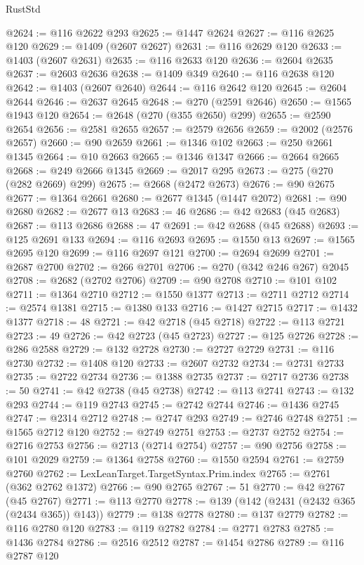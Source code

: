 \begin{lexlean}{RustStd}
\begin{coremodule}
@2624 := @116 @2622 @293
@2625 := @1447 @2624
@2627 := @116 @2625 @120
@2629 := @1409 (@2607 @2627)
@2631 := @116 @2629 @120
@2633 := @1403 (@2607 @2631)
@2635 := @116 @2633 @120
@2636 := @2604 @2635
@2637 := @2603 @2636
@2638 := @1409 @349
@2640 := @116 @2638 @120
@2642 := @1403 (@2607 @2640)
@2644 := @116 @2642 @120
@2645 := @2604 @2644
@2646 := @2637 @2645
@2648 := @270 (@2591 @2646)
@2650 := @1565 @1943 @120
@2654 := @2648 (@270 (@355 @2650) @299)
@2655 := @2590 @2654
@2656 := @2581 @2655
@2657 := @2579 @2656
@2659 := @2002 (@2576 @2657)
@2660 := @90 @2659
@2661 := @1346 @102
@2663 := @250 @2661 @1345
@2664 := @10 @2663
@2665 := @1346 @1347
@2666 := @2664 @2665
@2668 := @249 @2666 @1345
@2669 := @2017 @295
@2673 := @275 (@270 (@282 @2669) @299)
@2675 := @2668 (@2472 @2673)
@2676 := @90 @2675
@2677 := @1364 @2661
@2680 := @2677 @1345 (@1447 @2072)
@2681 := @90 @2680
@2682 := @2677 @13
@2683 := 46
@2686 := @42 @2683 (@45 @2683)
@2687 := @113 @2686
@2688 := 47
@2691 := @42 @2688 (@45 @2688)
@2693 := @125 @2691 @133
@2694 := @116 @2693
@2695 := @1550 @13
@2697 := @1565 @2695 @120
@2699 := @116 @2697 @121
@2700 := @2694 @2699
@2701 := @2687 @2700
@2702 := @266 @2701
@2706 := @270 (@342 @246 @267) @2045
@2708 := @2682 (@2702 @2706)
@2709 := @90 @2708
@2710 := @101 @102
@2711 := @1364 @2710
@2712 := @1550 @1377
@2713 := @2711 @2712
@2714 := @2574 @1381
@2715 := @1380 @133
@2716 := @1427 @2715
@2717 := @1432 @1377
@2718 := 48
@2721 := @42 @2718 (@45 @2718)
@2722 := @113 @2721
@2723 := 49
@2726 := @42 @2723 (@45 @2723)
@2727 := @125 @2726
@2728 := @286 @2588
@2729 := @132 @2728
@2730 := @2727 @2729
@2731 := @116 @2730
@2732 := @1408 @120
@2733 := @2607 @2732
@2734 := @2731 @2733
@2735 := @2722 @2734
@2736 := @1388 @2735
@2737 := @2717 @2736
@2738 := 50
@2741 := @42 @2738 (@45 @2738)
@2742 := @113 @2741
@2743 := @132 @293
@2744 := @119 @2743
@2745 := @2742 @2744
@2746 := @1436 @2745
@2747 := @2314 @2712
@2748 := @2747 @293
@2749 := @2746 @2748
@2751 := @1565 @2712 @120
@2752 := @2749 @2751
@2753 := @2737 @2752
@2754 := @2716 @2753
@2756 := @2713 (@2714 @2754)
@2757 := @90 @2756
@2758 := @101 @2029
@2759 := @1364 @2758
@2760 := @1550 @2594
@2761 := @2759 @2760
@2762 := LexLeanTarget.TargetSyntax.Prim.index
@2765 := @2761 (@362 @2762 @1372)
@2766 := @90 @2765
@2767 := 51
@2770 := @42 @2767 (@45 @2767)
@2771 := @113 @2770
@2778 := @139 (@142 (@2431 (@2432 @365 (@2434 @365)) @143))
@2779 := @138 @2778
@2780 := @137 @2779
@2782 := @116 @2780 @120
@2783 := @119 @2782
@2784 := @2771 @2783
@2785 := @1436 @2784
@2786 := @2516 @2512
@2787 := @1454 @2786
@2789 := @116 @2787 @120

\end{coremodule}
\end{lexlean}
